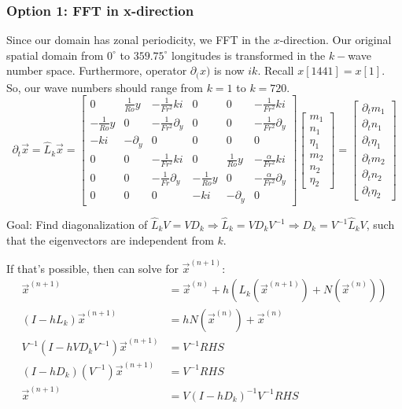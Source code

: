\documentclass[10pt]{article}
\newcommand{\pd}[1]{\partial_{#1}}
\begin{document}
\subsubsection{Option 1: FFT in x-direction } Since our domain has zonal periodicity, we FFT in the $x$-direction. Our original spatial domain from $0^{\circ}$ to $359.75^{\circ}$ longitudes is transformed in the $k-$wave number space. Furthermore, operator $\pd(x)$ is now $ik$. 
Recall $x[1441]=x[1]$. So, our wave numbers should range from $k=1$ to $k=720$. 
\[\pd{t}\vec{x} = \hat{L}_k\vec{x}=
\left[\begin{array}{ccc|ccc}
0 & \frac{1}{Ro}y & -\frac{1}{Fr^2}ki & 0 & 0 & -\frac{1}{Fr^2}ki \\
-\frac{1}{Ro}y & 0 & -\frac{1}{Fr^2}\pd{y} & 0 & 0 & -\frac{1}{Fr^2}\pd{y}\\
-ki & -\pd{y} & 0 & 0 & 0 & 0 \\ \hline
0 & 0 & -\frac{1}{Fr^2}ki & 0 & \frac{1}{Ro}y &  -\frac{\alpha}{Fr^2}ki \\
0 & 0 & -\frac{1}{Fr}\pd{y} & -\frac{1}{Ro}y  & 0&  -\frac{\alpha}{Fr^2}\pd{y} \\
0 & 0 & 0 & -ki & -\pd{y} & 0
\end{array}\right] \begin{bmatrix}
m_1\\
n_1\\
\eta_1\\
m_2\\
n_2\\
\eta_2
\end{bmatrix} = \begin{bmatrix}
\pd{t}m_1\\
\pd{t}n_1\\
\pd{t}\eta_1\\
\pd{t}m_2\\
\pd{t}n_2\\
\pd{t}\eta_2
\end{bmatrix}
\]

Goal: Find diagonalization of $\hat{L}_k V =V D_k \Rightarrow \hat{L}_k = V D_k V^{-1} \Rightarrow D_k = V^{-1}\hat{L}_k V$, such that the eigenvectors are independent from $k$.  

If that's possible, then can solve for $\vec{x}^{(n+1)}$:
\begin{align*}
\vec{x}^{(n+1)} &= \vec{x}^{(n)}+h\left(L_k(\vec{x}^{(n+1)}) + N(\vec{x}^{(n)}) \right) \\
(I-h L_k)\vec{x}^{(n+1)} & = h N(\vec{x}^{(n)}) + \vec{x}^{(n)}\\
V^{-1}(I-h VD_kV^{-1})\vec{x}^{(n+1)} & = V^{-1}RHS\\
(I-h D_k) (V^{-1})\vec{x}^{(n+1)} & = V^{-1}RHS \\
\vec{x}^{(n+1)} & = V (I-h D_k)^{-1} V^{-1}RHS 
\end{align*}
\end{document}
